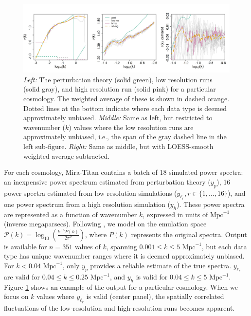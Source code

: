 \documentclass[11pt]{article}
\begin{document}
\begin{figure}[ht]
    \centering 
    \includegraphics[width=\linewidth]{plot_data.jpeg}
    \caption{{\it Left:} The perturbation theory (solid green), low resolution runs (solid gray), 
    and high resolution run  (solid pink) for a particular cosmology. 
    The weighted average of these is shown in dashed orange. Dotted lines at the bottom
    indicate where each data type is deemed approximately unbiased. 
    {\it Middle:} Same as left, but restricted to wavenumber ($k$) values where the low resolution 
    runs are approximately unbiased, i.e., the span of the gray dashed line in the left sub-figure.
    {\it Right:} Same as middle, but with LOESS-smooth weighted average subtracted.}
    \label{fig:plot_data}
\end{figure}

For each cosmology, Mira-Titan contains a batch of 18 simulated power spectra: an inexpensive 
power spectrum estimated from perturbation theory ($y_p$), 16 power spectra estimated from 
low resolution simulations ($y_{\ell_r}, r \in \{1,\dots,16\}$), and one power spectrum from 
a high resolution simulation ($y_h$). 
These power spectra are represented as a function of wavenumber $k$, expressed in units of 
$\text{Mpc}^{-1}$ (inverse megaparsecs).  Following 
\cite{moran2023mira}, we model on the emulation space 
$\mathcal{P}(k)=\log_{10}\left(\frac{k^{1.5}P(k)}{2\pi^2}\right)$, where $P(k)$ represents the
original spectra. Output is available for $n=351$ values of $k$, spanning
$0.001 \leq k \leq 5 \text{ Mpc}^{-1}$, but each data type has unique wavenumber ranges
where it is deemed approximately unbiased. For $k<0.04 \text{ Mpc}^{-1}$, only $y_p$ provides a reliable 
estimate of the true spectra. $y_{\ell_r}$ are valid for $0.04 \leq k \leq 0.25 \text{ Mpc}^{-1}$, and 
$y_h$ is valid for $0.04 \leq k \leq 5 \text{ Mpc}^{-1}$.  Figure \ref{fig:plot_data} shows an example 
of the output for a particular cosmology. When we focus on $k$ values where $y_{\ell_r}$ 
is valid (center panel), the spatially correlated fluctuations of the low-resolution and 
high-resolution runs becomes apparent.
\end{document}
